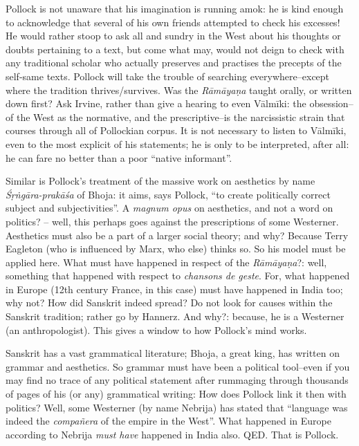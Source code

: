 Pollock is not unaware that his imagination is running amok: he is kind enough to acknowledge that several of his own friends attempted to check his excesses! He would rather stoop to ask all and sundry in the West about his thoughts or doubts pertaining to a text, but come what may, would not deign to check with any traditional scholar who actually preserves and practises the precepts of the self-same texts. Pollock will take the trouble of searching everywhere–except where the tradition thrives/survives. Was the \textit{Rāmāyaṇa} taught orally, or written down first? Ask Irvine, rather than give a hearing to even Vālmīki: the obsession–of the West as the normative, and the prescriptive–is the narcissistic strain that courses through all of Pollockian corpus. It is not necessary to listen to Vālmīki, even to the most explicit of his statements; he is only to be interpreted, after all: he can fare no better than a poor “native informant”.

Similar is Pollock’s treatment of the massive work on aesthetics by name \textit{Śṛṅgāra-prakāśa} of Bhoja: it aims, says Pollock, “to create politically correct subject and subjectivities”. A \textit{magnum opus} on aesthetics, and not a word on politics? – well, this perhaps goes against the prescriptions of some Westerner. Aesthetics must also be a part of a larger social theory; and why? Because Terry Eagleton (who is influenced by Marx, who else) thinks so. So his model must be applied here. What must have happened in respect of the \textit{Rāmāyaṇa}?: well, something that happened with respect to \textit{chansons de geste}. For, what happened in Europe (12th century France, in this case) must have happened in India too; why not? How did Sanskrit indeed spread? Do not look for causes within the Sanskrit tradition; rather go by Hannerz. And why?: because, he is a Westerner (an anthropologist). This gives a window to how Pollock’s mind works.

\newpage

Sanskrit has a vast grammatical literature; Bhoja, a great king, has written on grammar and aesthetics. So grammar must have been a political tool–even if you may find no trace of any political statement after rummaging through thousands of pages of his (or any) grammatical writing: How does Pollock link it then with politics? Well, some Westerner (by name Nebrija) has stated that “language was indeed the \textit{compañera} of the empire in the West”. What happened in Europe according to Nebrija \textit{must have} happened in India also. QED. That is Pollock.

